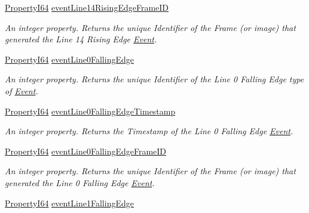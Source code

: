 \begin{DoxyCompactItemize}
\hyperlink{group___common_interface_ga81749b2696755513663492664a18a893}{Property\+I64} \hyperlink{classmv_i_m_p_a_c_t_1_1acquire_1_1_gen_i_cam_1_1_event_control_a82c16a3a38365df036f1afc04b0bd036}{event\+Line14\+Rising\+Edge\+Frame\+I\+D}
\begin{DoxyCompactList}\small\item\em An integer property. Returns the unique Identifier of the Frame (or image) that generated the Line 14 Rising Edge \hyperlink{classmv_i_m_p_a_c_t_1_1acquire_1_1_event}{Event}. \end{DoxyCompactList}\item 
\hyperlink{group___common_interface_ga81749b2696755513663492664a18a893}{Property\+I64} \hyperlink{classmv_i_m_p_a_c_t_1_1acquire_1_1_gen_i_cam_1_1_event_control_ac9895811cc7c03c7bda68e39be39e576}{event\+Line0\+Falling\+Edge}
\begin{DoxyCompactList}\small\item\em An integer property. Returns the unique Identifier of the Line 0 Falling Edge type of \hyperlink{classmv_i_m_p_a_c_t_1_1acquire_1_1_event}{Event}. \end{DoxyCompactList}\item 
\hyperlink{group___common_interface_ga81749b2696755513663492664a18a893}{Property\+I64} \hyperlink{classmv_i_m_p_a_c_t_1_1acquire_1_1_gen_i_cam_1_1_event_control_a1d4af28ff2fc46952a9219eb3b182f27}{event\+Line0\+Falling\+Edge\+Timestamp}
\begin{DoxyCompactList}\small\item\em An integer property. Returns the Timestamp of the Line 0 Falling Edge \hyperlink{classmv_i_m_p_a_c_t_1_1acquire_1_1_event}{Event}. \end{DoxyCompactList}\item 
\hyperlink{group___common_interface_ga81749b2696755513663492664a18a893}{Property\+I64} \hyperlink{classmv_i_m_p_a_c_t_1_1acquire_1_1_gen_i_cam_1_1_event_control_a62f1419fa2926fbde3514c3b8c670541}{event\+Line0\+Falling\+Edge\+Frame\+I\+D}
\begin{DoxyCompactList}\small\item\em An integer property. Returns the unique Identifier of the Frame (or image) that generated the Line 0 Falling Edge \hyperlink{classmv_i_m_p_a_c_t_1_1acquire_1_1_event}{Event}. \end{DoxyCompactList}\item 
\hyperlink{group___common_interface_ga81749b2696755513663492664a18a893}{Property\+I64} \hyperlink{classmv_i_m_p_a_c_t_1_1acquire_1_1_gen_i_cam_1_1_event_control_a8dc538a2ece5d23c4c48b4c2c8e26336}{event\+Line1\+Falling\+Edge}

\end{DoxyCompactItemize}
